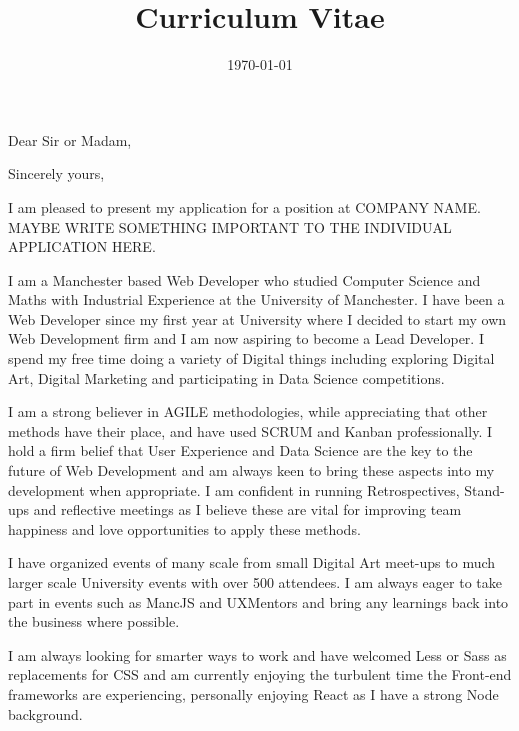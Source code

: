 \documentclass[11pt,a4paper,sans]{moderncv} %
\title{Curriculum Vitae}
\begin{document}


\clearpage

\date{\today} %
\opening{Dear Sir or Madam,} %
\closing{Sincerely yours,} %

\makelettertitle %

I am pleased to present my application for a position at COMPANY NAME. MAYBE WRITE SOMETHING IMPORTANT TO THE INDIVIDUAL APPLICATION HERE.

I am a Manchester based Web Developer who studied Computer Science and Maths with Industrial Experience at the University of Manchester. I have been a Web Developer since my first year at University where I decided to start my own Web Development firm and I am now aspiring to become a Lead Developer. I spend my free time doing a variety of Digital things including exploring Digital Art, Digital Marketing and participating in Data Science competitions.

I am a strong believer in AGILE methodologies, while appreciating that other methods have their place, and have used SCRUM and Kanban professionally. I hold a firm belief that User Experience and Data Science are the key to the future of Web Development and am always keen to bring these aspects into my development when appropriate. I am confident in running Retrospectives, Stand-ups and reflective meetings as I believe these are vital for improving team happiness and love opportunities to apply these methods.

I have organized events of many scale from small Digital Art meet-ups to much larger scale University events with over 500 attendees. I am always eager to take part in events such as MancJS and UXMentors and bring any learnings back into the business where possible.

I am always looking for smarter ways to work and have welcomed Less or Sass as replacements for CSS and am currently enjoying the turbulent time the Front-end frameworks are experiencing, personally enjoying React as I have a strong Node background.
\end{document}
